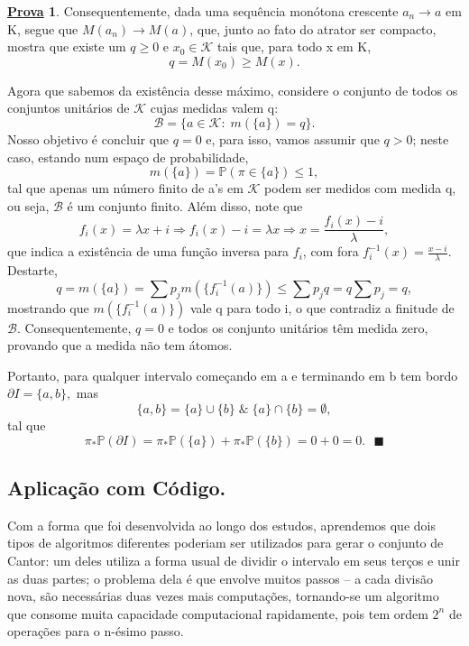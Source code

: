 \documentclass[12pt]{article}
\theoremstyle{definition}
\newtheorem*{proof*}{\underline{Prova}}
\renewcommand\qedsymbol{$\blacksquare$}
\begin{document}
\begin{proof*}
	Consequentemente, dada uma sequência monótona crescente \(a_{n}\to a\) em K, segue que \(M(a_{n})\to M(a)\), que, junto ao fato do atrator ser compacto, mostra que existe um \(q\geq0\) e \(x_{0}\in \mathcal{K}\) tais que, para todo x em K,
	\[
		q = M(x_{0}) \geq M(x).
	\]

	Agora que sabemos da existência desse máximo, considere o conjunto de todos os conjuntos unitários de \(\mathcal{K}\) cujas medidas valem q:
	\[
		\mathcal{B} = \{a\in \mathcal{K}:\; m(\{a\}) = q\}.
	\]
	Nosso objetivo é concluir que \(q=0\) e, para isso, vamos assumir que \(q > 0\); neste caso, estando num espaço de probabilidade,
	\[
		m(\{a\}) = \mathbb{P}(\pi \in \{a\})\leq 1,
	\]
	tal que apenas um número finito de a's em \(\mathcal{K}\) podem ser medidos com medida q, ou seja, \(\mathcal{B}\) é um conjunto finito. Além disso, note que
	\[
		f_{i}(x) = \lambda x + i \Rightarrow f_{i}(x) -i = \lambda x \Rightarrow x = \frac{f_{i}(x) - i}{\lambda },
	\]
	que indica a existência de uma função inversa para \(f_{i}\), com fora \(f_{i}^{-1}(x) = \frac{x-i}{\lambda }.\) Destarte,
	\[
		q = m(\{a\}) = \sum p_{j}m(\{f_{i}^{-1}(a)\}) \leq \sum p_{j}q = q \sum p_{j} = q,
	\]
	mostrando que \(m(\{f_{i}^{-1}(a)\})\) vale q para todo i, o que contradiz a finitude de \(\mathcal{B}.\) Consequentemente, \(q = 0\) e todos os conjunto unitários têm medida zero, provando que a medida não tem átomos.

	Portanto, para qualquer intervalo começando em a e terminando em b tem bordo \(\partial I = \{a, b\},\) mas
	\[
		\{a, b\} = \{a\} \cup \{b\} \;\&\; \{a\}\cap \{b\} = \emptyset ,
	\]
	tal que
	\[
		\pi_{*}\mathbb{P}(\partial I) = \pi_{*}\mathbb{P}(\{a\}) + \pi_{*}\mathbb{P}(\{b\}) = 0+0 = 0. \text{ \qedsymbol}
	\]
\end{proof*}


\subsection*{Aplicação com Código.}
Com a forma que foi desenvolvida ao longo dos estudos, aprendemos que dois tipos de algoritmos diferentes poderiam ser utilizados para gerar o conjunto de Cantor: um deles utiliza a forma usual de dividir o intervalo em seus terços e unir as duas partes; o problema dela é que envolve muitos passos -- a cada divisão nova, são necessárias duas vezes mais computações, tornando-se um algoritmo que consome muita capacidade computacional rapidamente, pois tem ordem \(2^{n}\) de operações para o n-ésimo passo.
\end{document}
